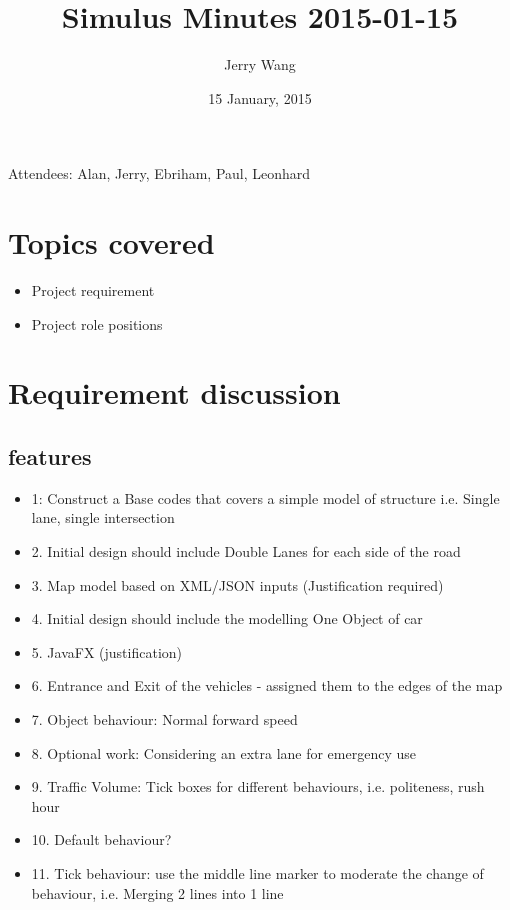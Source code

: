 \documentclass{article}
\author {Jerry Wang}
\title{Simulus Minutes 2015-01-15}
\date {15 January, 2015}
\begin{document}
\maketitle

Attendees: Alan, Jerry, Ebriham, Paul, Leonhard 

\section {Topics covered}
\begin{itemize}
\item Project requirement 
\item Project role positions
\end{itemize}


\section {Requirement discussion}
\subsection {features}

\begin{itemize}

\item          1: Construct a Base codes that covers a simple model of structure i.e. Single lane, single intersection  
\item          2. Initial design should include Double Lanes for each side of the road
\item          3. Map model based on XML/JSON inputs (Justification required)
 \item         4. Initial design should include the modelling One Object of car  
\item          5. JavaFX (justification)
 \item         6. Entrance and Exit of the vehicles - assigned them to the edges of the map
  \item        7. Object behaviour: Normal forward speed 
   \item       8. Optional work: Considering an extra lane for emergency use
\item          9. Traffic Volume: Tick boxes for different behaviours, i.e. politeness, rush hour 
 \item         10. Default behaviour? 
  \item        11. Tick behaviour: use the middle line marker to moderate the change of behaviour, i.e. Merging 2 lines into 1 line


\end{itemize}
\end{document}
